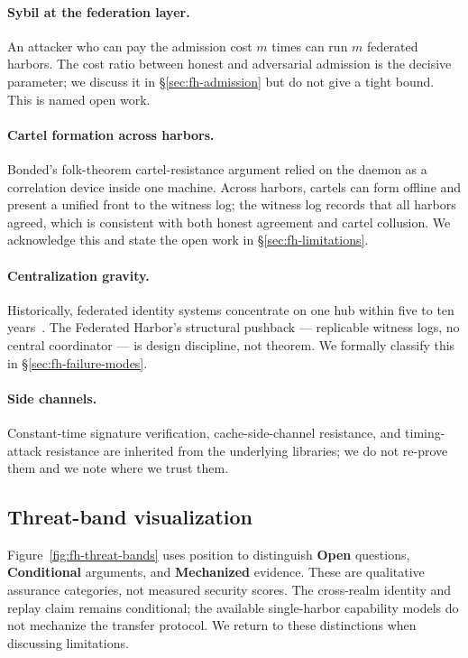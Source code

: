 \documentclass[11pt,a4paper]{article}
\theoremstyle{definition}
\theoremstyle{remark}
\begin{document}
\paragraph{Sybil at the federation layer.} An attacker who can pay the admission cost $m$ times can run $m$ federated harbors. The cost ratio between honest and adversarial admission is the decisive parameter; we discuss it in \S\ref{sec:fh-admission} but do not give a tight bound. This is named open work.

\paragraph{Cartel formation across harbors.} Bonded's folk-theorem cartel-resistance argument relied on the daemon as a correlation device inside one machine. Across harbors, cartels can form offline and present a unified front to the witness log; the witness log records that all harbors agreed, which is consistent with both honest agreement and cartel collusion. We acknowledge this and state the open work in \S\ref{sec:fh-limitations}.

\paragraph{Centralization gravity.} Historically, federated identity systems concentrate on one hub within five to ten years~. The Federated Harbor's structural pushback --- replicable witness logs, no central coordinator --- is design discipline, not theorem. We formally classify this in \S\ref{sec:fh-failure-modes}.

\paragraph{Side channels.} Constant-time signature verification, cache-side-channel resistance, and timing-attack resistance are inherited from the underlying libraries; we do not re-prove them and we note where we trust them.

\subsection{Threat-band visualization}\label{sec:fh-threat-band-viz}

Figure~\ref{fig:fh-threat-bands} uses position to distinguish \textbf{Open} questions, \textbf{Conditional} arguments, and \textbf{Mechanized} evidence. These are qualitative assurance categories, not measured security scores. The cross-realm identity and replay claim remains conditional; the available single-harbor capability models do not mechanize the transfer protocol. We return to these distinctions when discussing limitations.
\end{document}
